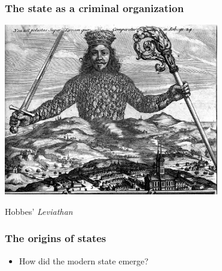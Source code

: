 \documentclass[aspectratio=43]{beamer}
\begin{document}
\begin{frame}
\frametitle{The state as a criminal organization}
\centering

\includegraphics[width = 0.7\textwidth]{img/leviathan}

\vspace{20pt}

{\small Hobbes' \textit{Leviathan}}

\end{frame}


\begin{frame}
\frametitle{The origins of states}
\centering

\begin{itemize}
  \item How did the modern state emerge?
\end{itemize}

\end{frame}
\end{document}
